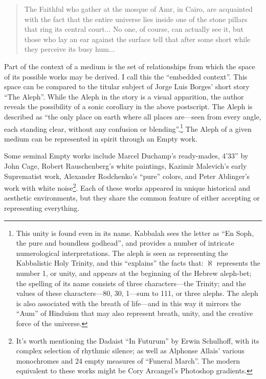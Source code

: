\documentclass{thesis}
\begin{document}
	\begin{quote}
	The Faithful who gather at the mosque of Amr, in Cairo, are acquainted with the fact that the entire universe lies inside one of the stone pillars that ring its central court... No one, of course, can actually see it, but those who lay an ear against the surface tell that after some short while they perceive its busy hum...
	\end{quote}

Part of the context of a medium is the set of relationships from which the space of its possible works may be derived. I call this the ``embedded context''. This space can be compared to the titular subject of Jorge Luis Borges' short story ``The Aleph''\cite{borges_aleph_2004}. While the Aleph in the story is a visual apparition, the author reveals the possibility of a sonic corollary in the above postscript. The Aleph is described as ``the only place on earth where all places are---seen from every angle, each standing clear, without any confusion or blending''.\footnote{This unity is found even in its name. Kabbalah sees the letter as ``En Soph, the pure and boundless godhead'', and provides a number of intricate numerological interpretations.\cite{_01:_2009} The aleph is seen as representing the Kabbalistic Holy Trinity, and this ``explains'' the facts that: $\aleph$ represents the number 1, or unity, and appears at the beginning of the Hebrew aleph-bet; the spelling of its name consists of three characters---the Trinity; and the values of these characters---80, 30, 1---sum to 111, or three alephs. The aleph is also associated with the breath of life---and in this way it mirrors the ``Aum'' of Hinduism that may also represent breath, unity, and the creative force of the universe.} The Aleph of a given medium can be represented in spirit through an Empty work.

Some seminal Empty works include Marcel Duchamp's ready-mades, 4'33'' by John Cage\cite{larry_j_solomon_sounds_1998}, Robert Rauschenberg's white paintings, Kazimir Malevich's early Suprematist work\cite{moma_kazimir_2006}, Alexander Rodchenko's ``pure'' colors\cite{moma_rodchenko_1998}, and Peter Ablinger's work with white noise\footnote{It's worth mentioning the Dadaist ``In Futurum'' by   Erwin Schulhoff, with its complex selection of rhythmic silence; as well as Alphonse Allais' various monochromes and 24 empty measures of ``Funeral March''.\cite{larry_j_solomon_sounds_1998} The modern equivalent to these works might be Cory Arcangel's Photoshop gradients.\cite{cory_arcangel_photoshop_2009}}. Each of these works appeared in unique historical and aesthetic environments, but they share the common feature of either accepting or representing everything.
\end{document}
